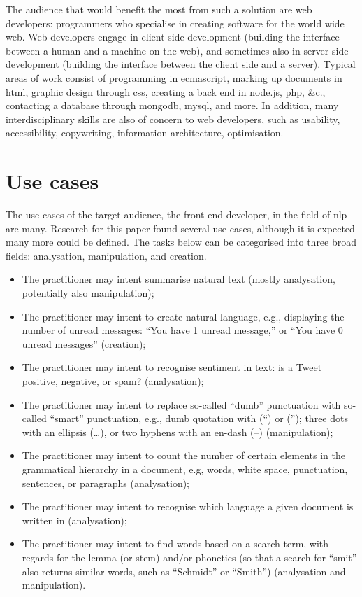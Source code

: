 The audience that would benefit the most from such a solution are web
developers: programmers who specialise in creating software for the
world wide web. Web developers engage in client side development
(building the interface between a human and a machine on the web), and
sometimes also in server side development (building the interface
between the client side and a server). Typical areas of work consist of
programming in \gls{ecmascript}, marking up documents in \gls{html}, graphic
design through \gls{css}, creating a back end in node.js, \gls{php},
\&c., contacting a database through \gls{mongodb}, \gls{mysql}, and
more. In addition, many interdisciplinary skills are also of concern to
web developers, such as usability, accessibility, copywriting,
information architecture, optimisation.

\section{Use cases}\label{use-cases}

The use cases of the target audience, the front-end developer, in the
field of \gls{nlp} are many. Research for this paper found several use
cases, although it is expected many more could be defined. The tasks
below can be categorised into three broad fields: analysation,
manipulation, and creation.

\begin{itemize}
\itemsep1pt\parskip0pt
\item
  The practitioner may intent summarise natural text (mostly
  analysation, potentially also manipulation);
\item
  The practitioner may intent to create natural language, e.g.,
  displaying the number of unread messages: ``You have 1 unread
  message,'' or ``You have 0 unread messages'' (creation);
\item
  The practitioner may intent to recognise sentiment in text: is a Tweet
  positive, negative, or spam? (analysation);
\item
  The practitioner may intent to replace so-called ``dumb'' punctuation
  with so-called ``smart'' punctuation, e.g., dumb quotation with (``)
  or (''); three dots with an ellipsis (\ldots{}), or two hyphens with
  an en-dash (--) (manipulation);
\item
  The practitioner may intent to count the number of certain elements in
  the grammatical hierarchy in a document, e.g, words, white space,
  punctuation, sentences, or paragraphs (analysation);
\item
  The practitioner may intent to recognise which language a given
  document is written in (analysation);
\item
  The practitioner may intent to find words based on a search term, with
  regards for the lemma (or stem) and/or phonetics (so that a search for
  ``smit'' also returns similar words, such as ``Schmidt'' or ``Smith'')
  (analysation and manipulation).
\end{itemize}


